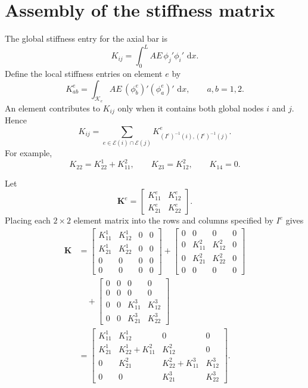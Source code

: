 \documentclass[11pt,letterpaper]{scrartcl}
\newcommand{\dd}{\,\mathrm{d}}
\newcommand{\bK}{\bm{K}}
\begin{document}
\section{Assembly of the stiffness matrix}

The global stiffness entry for the axial bar is
\begin{equation}
K_{ij}=\int_0^L AE\,\phi_j'\phi_i'\,\dd x.
\label{eq:global-stiffness-entry}
\end{equation}
Define the local stiffness entries on element $e$ by
\begin{equation}
K_{ab}^e
=\int_{\mathcal K_e}AE\,(\phi_b^e)'(\phi_a^e)'\,\dd x,
\qquad a,b=1,2.
\label{eq:local-stiffness-entry}
\end{equation}
An element contributes to $K_{ij}$ only when it contains both global nodes
$i$ and $j$. Hence
\begin{equation}
\boxed{
K_{ij}
=\sum_{e\in\mathcal E(i)\cap\mathcal E(j)}
K_{(I^e)^{-1}(i),(I^e)^{-1}(j)}^e.
}
\label{eq:stiffness-entry-assembly}
\end{equation}
For example,
\[
K_{22}=K_{22}^1+K_{11}^2,
\qquad
K_{23}=K_{12}^2,
\qquad
K_{14}=0.
\]

Let
\[
\bK^e=
\begin{bmatrix}K_{11}^e&K_{12}^e\\K_{21}^e&K_{22}^e\end{bmatrix}.
\]
Placing each $2\times2$ element matrix into the rows and columns specified by
$I^e$ gives
\begin{align}
\bK
&=
\begin{bmatrix}
K_{11}^1&K_{12}^1&0&0\\
K_{21}^1&K_{22}^1&0&0\\
0&0&0&0\\
0&0&0&0
\end{bmatrix}
+
\begin{bmatrix}
0&0&0&0\\
0&K_{11}^2&K_{12}^2&0\\
0&K_{21}^2&K_{22}^2&0\\
0&0&0&0
\end{bmatrix}
\nonumber\\
&\quad+
\begin{bmatrix}
0&0&0&0\\
0&0&0&0\\
0&0&K_{11}^3&K_{12}^3\\
0&0&K_{21}^3&K_{22}^3
\end{bmatrix}
\nonumber\\[2pt]
&=
\begin{bmatrix}
K_{11}^1&K_{12}^1&0&0\\
K_{21}^1&K_{22}^1+K_{11}^2&K_{12}^2&0\\
0&K_{21}^2&K_{22}^2+K_{11}^3&K_{12}^3\\
0&0&K_{21}^3&K_{22}^3
\end{bmatrix}.
\label{eq:global-stiffness-matrix}
\end{align}
\end{document}
